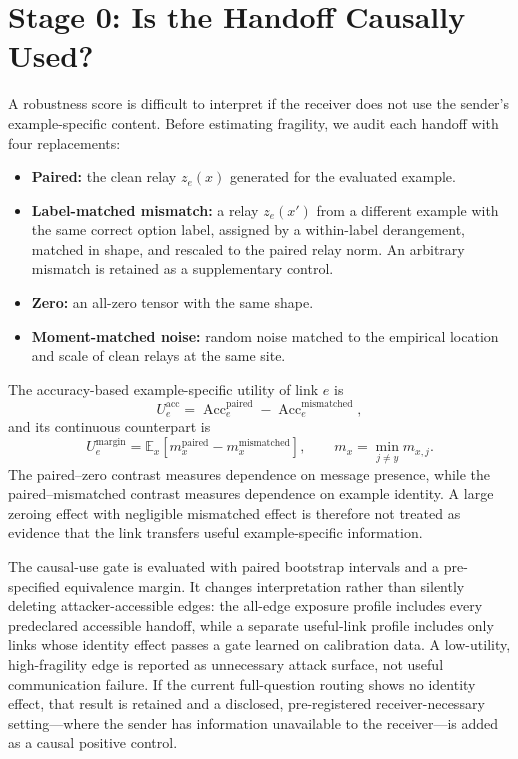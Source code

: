 \documentclass[11pt]{article}
\DeclareMathOperator{\Acc}{Acc}
\newcommand{\E}{\mathbb E}
\begin{document}
\section{Stage 0: Is the Handoff Causally Used?}
\label{sec:causal-gate}

A robustness score is difficult to interpret if the receiver does not use the
sender's example-specific content. Before estimating fragility, we audit each
handoff with four replacements:
\begin{itemize}
    \item \textbf{Paired:} the clean relay $z_e(x)$ generated for the evaluated
    example.
    \item \textbf{Label-matched mismatch:} a relay $z_e(x')$ from a different
    example with the same correct option label, assigned by a within-label
    derangement, matched in shape, and rescaled to the paired relay norm. An
    arbitrary mismatch is retained as a supplementary control.
    \item \textbf{Zero:} an all-zero tensor with the same shape.
    \item \textbf{Moment-matched noise:} random noise matched to the empirical
    location and scale of clean relays at the same site.
\end{itemize}

The accuracy-based example-specific utility of link $e$ is
\begin{equation}
    U_e^{\mathrm{acc}}
    =
    \Acc_e^{\mathrm{paired}}
    -
    \Acc_e^{\mathrm{mismatched}},
    \label{eq:utility-accuracy}
\end{equation}
and its continuous counterpart is
\begin{equation}
    U_e^{\mathrm{margin}}
    =
    \E_x\!\left[
    m_x^{\mathrm{paired}}-m_x^{\mathrm{mismatched}}
    \right],
    \qquad
    m_x=\min_{j\ne y}m_{x,j}.
    \label{eq:utility-margin}
\end{equation}
The paired--zero contrast measures dependence on message presence, while the
paired--mismatched contrast measures dependence on example identity. A large
zeroing effect with negligible mismatched effect is therefore not treated as
evidence that the link transfers useful example-specific information.

The causal-use gate is evaluated with paired bootstrap intervals and a
pre-specified equivalence margin. It changes interpretation rather than
silently deleting attacker-accessible edges: the all-edge exposure profile
includes every predeclared accessible handoff, while a separate useful-link
profile includes only links whose identity effect passes a gate learned on
calibration data. A low-utility, high-fragility edge is reported as unnecessary
attack surface, not useful communication failure. If the current full-question
routing shows no identity effect, that result is retained and a disclosed,
pre-registered receiver-necessary setting---where the sender has information
unavailable to the receiver---is added as a causal positive control.
\end{document}
